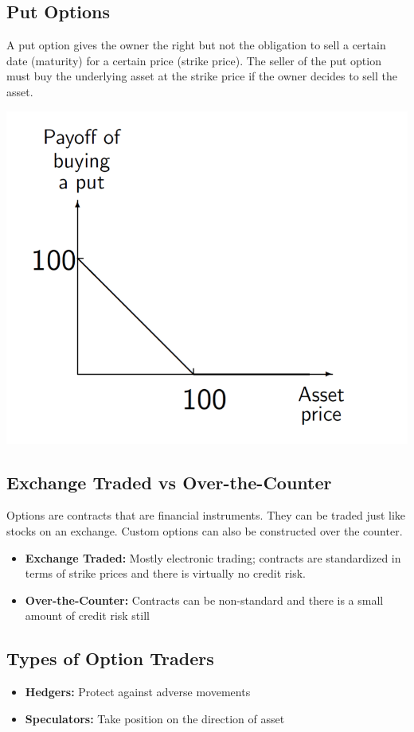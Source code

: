 \documentclass[11pt]{article}
\begin{document}
\subsection{Put Options }
A put option gives the owner the right but not the obligation to sell a certain date (maturity) for a certain price (strike price). The seller of the put option must buy the underlying asset at the strike price if the owner decides to sell the asset. 
\begin{center}
\includegraphics[scale=0.4]{images/put.png} 
\end{center}

\subsection{Exchange Traded vs Over-the-Counter}
Options are contracts that are financial instruments. They can be traded just like stocks on an exchange. Custom options can also be constructed over the counter.
\begin{itemize}
\item \textbf{Exchange Traded:} Mostly electronic trading; contracts are standardized in terms of strike prices and there is virtually no credit risk. 
\item \textbf{Over-the-Counter:} Contracts can be non-standard and there is a small amount of credit risk still 
\end{itemize}

\subsection{Types of Option Traders}
\begin{itemize}
\item \textbf{Hedgers:} Protect against adverse movements
\item \textbf{Speculators:} Take position on the direction of asset
\end{itemize}
\end{document}
